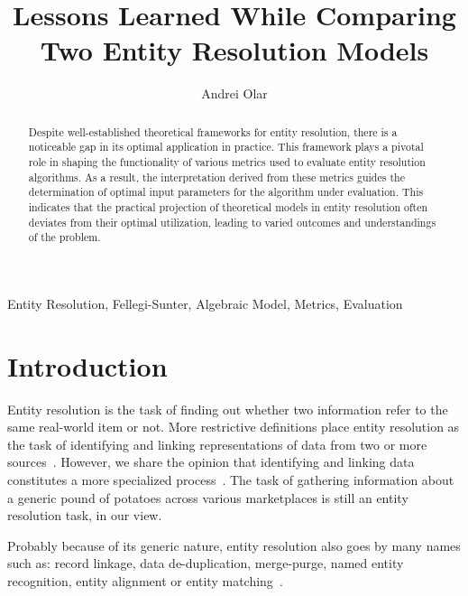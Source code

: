 \documentclass[lettersize,journal]{IEEEtran}
\begin{document}
    \title{Lessons Learned While Comparing Two Entity Resolution Models}
    \author{Andrei Olar}

    \maketitle

    \theoremstyle{definition}
    \newtheorem{defn}{Definition}[section]
    
    \maketitle
    \begin{abstract}
        Despite well-established theoretical frameworks for entity resolution,
        there is a noticeable gap in its optimal application in practice.
        This framework plays a pivotal role in shaping the functionality of
        various metrics used to evaluate entity resolution algorithms.
        As a result, the interpretation derived from these metrics guides the
        determination of optimal input parameters for the algorithm under
        evaluation.
        This indicates that the practical projection of theoretical models in
        entity resolution often deviates from their optimal utilization, leading
        to varied outcomes and understandings of the problem.
    \end{abstract}

    \begin{IEEEkeywords}
        Entity Resolution, Fellegi-Sunter, Algebraic Model, Metrics, Evaluation
    \end{IEEEkeywords}

    \section{Introduction}\label{sec:introduction}
    Entity resolution is the task of finding out whether two information refer
    to the same real-world item or not.
    More restrictive definitions place entity resolution as the task of
    identifying and linking representations of data from two or more
    sources~\cite{Qia17}.
    However, we share the opinion that identifying and linking data constitutes
    a more specialized process~\cite{Tal11}.
    The task of gathering information about a generic pound of potatoes across
    various marketplaces is still an entity resolution task, in our view.
    
    Probably because of its generic nature, entity resolution also goes by many
    names such as: record linkage, data de-duplication, merge-purge,
    named entity recognition, entity alignment or entity
    matching~\cite{Tal11,fever2009}.
\end{document}

